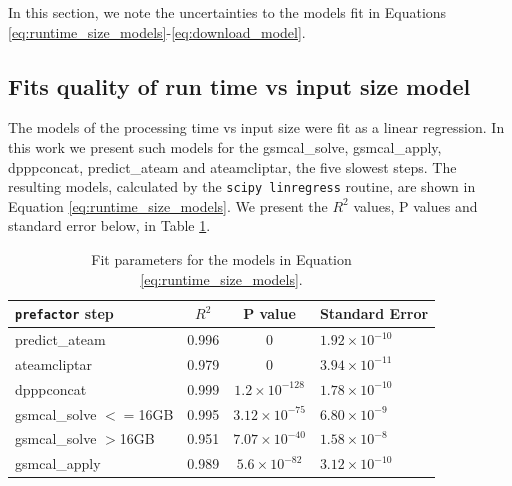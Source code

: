 In this section, we note the uncertainties to the models fit in Equations \ref{eq:runtime_size_models}-\ref{eq:download_model}. 

\setcounter{equation}{6}
\renewcommand{\theequation}{\Alph{section}.\arabic{equation}}

\subsection{Fits quality of run time vs input size model}

The models of the processing time vs input size were fit as a linear regression. In this work we present such models for the {\selectfont  gsmcal\_solve}, {\selectfont gsmcal\_apply}, {\selectfont dpppconcat}, {\selectfont predict\_ateam} and {\selectfont ateamcliptar}, the five slowest steps. The resulting models, calculated by the \texttt{scipy linregress}\citep{scipy} routine, are shown in Equation \ref{eq:runtime_size_models}. We present the $R^2$ values, P values and standard error below, in Table \ref{table:fits_size}.



\begin{table}[ht!]
\centering
\begin{tabular}{||p{2.2cm}| c | c|p{2cm}||} 
 \hline
 \texttt{prefactor} step & $R^2$ & P value & Standard Error \\ [0.5ex]
 \hline
 predict\_ateam & 0.996   & 0                    & $1.92\times10^{-10}$    \\ 
 \hline
 ateamcliptar   & 0.979   & 0                    & $3.94\times10^{-11}$    \\ 
 \hline
 dpppconcat     & 0.999   & $1.2\times10^{-128}$ & $1.78\times10^{-10}$    \\ 
 \hline
 gsmcal\_solve $<=$16GB  & 0.995   & $3.12\times10^{-75}$ & $6.80\times10^{-9}$     \\ 
 \hline
 gsmcal\_solve $>$16GB  & 0.951   & $7.07\times10^{-40}$ & $1.58\times10^{-8}$     \\ 
 \hline
 gsmcal\_apply  & 0.989   & $5.6\times10^{-82}$  & $3.12\times10^{-10}$    \\ 

\hline
\end{tabular}
\caption{Fit parameters for the models in Equation \ref{eq:runtime_size_models}. }
\label{table:fits_size}
\end{table}


